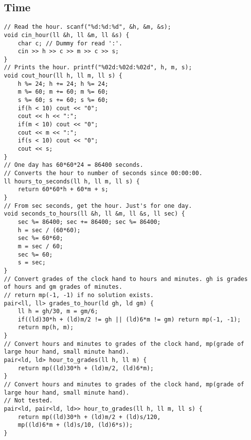 \documentclass[a4paper]{article}
\begin{document}
\subsection*{Time}
\begin{multicols}{2}
\begin{verbatim}
// Read the hour. scanf("%d:%d:%d", &h, &m, &s);
void cin_hour(ll &h, ll &m, ll &s) {
    char c; // Dummy for read ':'.
    cin >> h >> c >> m >> c >> s;
}
// Prints the hour. printf("%02d:%02d:%02d", h, m, s);
void cout_hour(ll h, ll m, ll s) {
    h %= 24; h += 24; h %= 24;
    m %= 60; m += 60; m %= 60;
    s %= 60; s += 60; s %= 60;
    if(h < 10) cout << "0";
    cout << h << ":";
    if(m < 10) cout << "0";
    cout << m << ":";
    if(s < 10) cout << "0";
    cout << s; 
}
// One day has 60*60*24 = 86400 seconds.
// Converts the hour to number of seconds since 00:00:00.
ll hours_to_seconds(ll h, ll m, ll s) {
    return 60*60*h + 60*m + s;
}
// From sec seconds, get the hour. Just's for one day.
void seconds_to_hours(ll &h, ll &m, ll &s, ll sec) {
    sec %= 86400; sec += 86400; sec %= 86400;
    h = sec / (60*60);
    sec %= 60*60;
    m = sec / 60;
    sec %= 60;
    s = sec;
}
// Convert grades of the clock hand to hours and minutes. gh is grades of hours and gm grades of minutes.
// return mp(-1, -1) if no solution exists.
pair<ll, ll> grades_to_hour(ld gh, ld gm) {
    ll h = gh/30, m = gm/6;
    if((ld)30*h + (ld)m/2 != gh || (ld)6*m != gm) return mp(-1, -1);
    return mp(h, m);
}
// Convert hours and minutes to grades of the clock hand, mp(grade of large hour hand, small minute hand).
pair<ld, ld> hour_to_grades(ll h, ll m) {
    return mp((ld)30*h + (ld)m/2, (ld)6*m);
}
// Convert hours and minutes to grades of the clock hand, mp(grade of large hour hand, small minute hand).
// Not tested.
pair<ld, pair<ld, ld>> hour_to_grades(ll h, ll m, ll s) {
    return mp((ld)30*h + (ld)m/2 + (ld)s/120, 
    mp((ld)6*m + (ld)s/10, (ld)6*s));
}
\end{verbatim}
\end{multicols}
\end{document}
